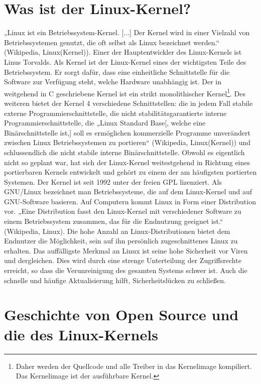 \documentclass[a4paper,12pt]{article}
\begin{document}
\section{Was ist der Linux-Kernel?}%
„Linux ist ein Betriebssystem-Kernel. [...] Der Kernel wird in einer Vielzahl von Betriebssystemen genutzt, die oft selbst als Linux bezeichnet werden.“ (Wikipedia, Linux(Kernel)). Einer der Hauptentwickler des Linux-Kernels ist Linus Torvalds. Als Kernel ist der Linux-Kernel eines der wichtigsten Teile des Betriebssystem. Er sorgt dafür, dass eine einheitliche Schnittstelle für die Software zur Verfügung steht, welche Hardware unabhängig ist. Der in weitgehend in C geschriebene Kernel ist ein strikt monolithischer Kernel\footnote{Daher werden der Quellcode und alle Treiber in das Kernelimage kompiliert. Das Kernelimage ist der ausführbare Kernel.}. Des weiteren bietet der Kernel 4 verschiedene Schnittstellen: die in jedem Fall stabile externe Programmierschnittstelle, die nicht stabilitätsgarantierte interne Programmierschnittstelle, die „Linux Standard Base[, welche eine Binärschnittstelle ist,] soll es ermöglichen kommerzielle Programme unverändert zwischen Linux Betriebssystemen zu portieren“ (Wikipedia, Linux(Kernel)) und schlussendlich die nicht stabile interne Binärschnittstelle. Obwohl es eigentlich nicht so geplant war, hat sich der Linux-Kernel weitestgehend in Richtung eines portierbaren Kernels entwickelt und gehört zu einem der am häufigsten portierten Systemen. Der Kernel ist seit 1992 unter der freien GPL lizenziert.
Als GNU/Linux bezeichnet man Betriebssysteme, die auf dem Linux-Kernel und auf GNU-Software basieren. Auf Computern kommt Linux in Form einer Distribution vor. „Eine Distribution fasst den Linux-Kernel mit verschiedener Software zu einem Betriebssystem zusammen, das für die Endnutzung geeignet ist.“ (Wikipedia, Linux). Die hohe Anzahl an Linux-Distributionen bietet dem Endnutzer die Möglichkeit, sein auf ihn persönlich zugeschnittenes Linux zu erhalten. Das auffälligste Merkmal an Linux ist seine hohe Sicherheit vor Viren und dergleichen. Dies wird durch eine strenge Unterteilung der Zugriffsrechte erreicht, so dass die Verunreinigung des gesamten Systems schwer ist. Auch die schnelle und häufige Aktualisierung hilft, Sicherheitslücken zu schließen.
\newpage
\section{Geschichte von Open Source und die des Linux-Kernels}
\end{document}
